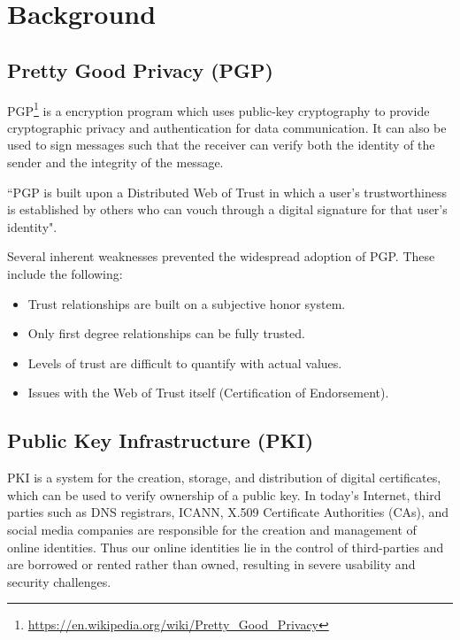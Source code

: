 \chapter{Background}\label{chapter::background}

\section{Pretty Good Privacy (PGP)}
	PGP\footnote{\url{https://en.wikipedia.org/wiki/Pretty_Good_Privacy}} is a encryption program which uses public-key cryptography\cite{stallings1999cryptography} to provide cryptographic privacy and authentication for data communication. It can also be used to sign messages such that the receiver can verify both the identity of the sender and the integrity of the message.
	
	``PGP is built upon a Distributed Web of Trust in which a user's trustworthiness is established by others who can vouch through a digital signature for that user's identity"\cite{wilson2015pretty}.
	
	Several inherent weaknesses prevented the widespread adoption of PGP. These include the following\cite{wilson2015pretty}:
	\begin{itemize}
		\item Trust relationships are built on a subjective honor system.
		\item Only first degree relationships can be fully trusted.
		\item Levels of trust are difficult to quantify with actual values.
		\item Issues with the Web of Trust itself (Certification of Endorsement).
	\end{itemize}
	
\section{Public Key Infrastructure (PKI)}
	PKI is a system for the creation, storage, and distribution of digital certificates, which can be used to verify ownership of a public key\cite{weise2001public}. In today's Internet, third parties such as DNS registrars, ICANN, X.509 Certificate Authorities (CAs), and social media companies are responsible for the creation and management of online identities. Thus our online identities lie in the control of third-parties and are borrowed or rented rather than owned, resulting in severe usability and security challenges\cite{allen2015decentralized}.
	
